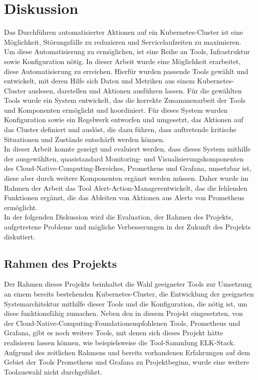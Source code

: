 \documentclass[a4paper,10pt]{scrartcl}
\begin{document}
\pagebreak

\section{Diskussion}

Das Durchführen automatisierter Aktionen auf ein Kubernetes-Cluster ist eine Möglichkeit, Störungsfälle zu reduzieren und Servicelaufzeiten zu maximieren. Um diese Automatisierung zu ermöglichen, ist eine Reihe an Tools, Infrastruktur sowie Konfiguration nötig. In dieser Arbeit wurde eine Möglichkeit erarbeitet, diese Automatisierung zu erreichen. Hierfür wurden passende Tools gewählt und entwickelt, mit deren Hilfe sich Daten und Metriken aus einem Kubernetes-Cluster auslesen, darstellen und Aktionen ausführen lassen. Für die gewählten Tools wurde ein System entwickelt, das die korrekte Zusammenarbeit der Tools und Komponenten ermöglicht und koordiniert. Für dieses System wurden Konfiguration sowie ein Regelwerk entworfen und umgesetzt, das Aktionen auf das Cluster definiert und auslöst, die dazu führen, dass auftretende kritische Situationen und Zustände entschärft werden können.\\
In dieser Arbeit konnte gezeigt und evaluiert werden, dass dieses System mithilfe der ausgewählten, quasistandard Monitoring- und Visualisierungskomponenten des \glqq Cloud-Native-Computing\grqq -Bereiches, Prometheus und Grafana, umsetzbar ist, diese aber durch weitere Komponenten ergänzt werden müssen. Daher wurde im Rahmen der Arbeit das Tool \glqq Alert-Action-Manager\grqq entwickelt, das die fehlenden Funktionen ergänzt, die das Ableiten von Aktionen aus Alerts von Prometheus ermöglicht. \\
In der folgenden Diskussion wird die Evaluation, der Rahmen des Projekts, aufgetretene Probleme und mögliche Verbesserungen in der Zukunft des Projekts diskutiert.

\subsection{Rahmen des Projekts}

Der Rahmen dieses Projekts beinhaltet die Wahl geeigneter Tools zur Umsetzung an einem bereits bestehenden Kubernetes-Cluster, die Entwicklung der geeigneten Systemarchitektur mithilfe dieser Tools und die Konfiguration, die nötig ist, um diese funktionsfähig zumachen.
Neben den in diesem Projekt eingesetzten, von der \glqq Cloud-Native-Computing-Foundation\grqq empfohlenen Tools, Prometheus und Grafana, gibt es noch weitere Tools, mit denen sich dieses Projekt hätte realisieren lassen können, wie beispielsweise die Tool-Sammlung \glqq ELK\grqq -Stack. Aufgrund des zeitlichen Rahmens und bereits vorhandenen Erfahrungen auf dem Gebiet der Tools Prometheus und Grafana zu Projektbeginn, wurde eine weitere Toolauswahl nicht durchgeführt.
\end{document}
